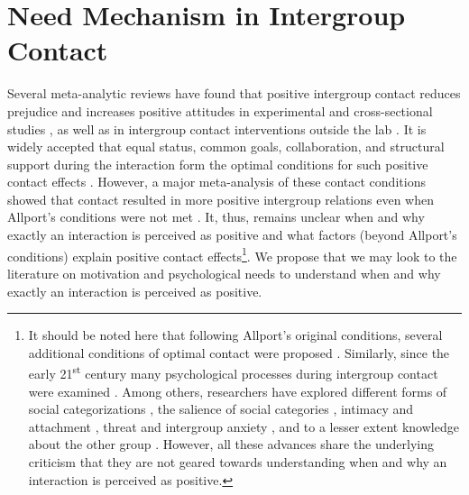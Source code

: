 \documentclass[man, 12pt, a4paper, mask]{apa7}
\theoremstyle{break}
\theoremstyle{plain}
\begin{document}
\section{Need Mechanism in Intergroup Contact}
Several meta-analytic reviews have found that positive intergroup contact reduces prejudice and increases positive attitudes in experimental and cross-sectional studies \citep[][]{Tropp2005, Pettigrew2006, Davies2011}, as well as in intergroup contact interventions outside the lab \citep[][]{Beelmann2014, Lemmer2015}. It is widely accepted that equal status, common goals, collaboration, and structural support during the interaction form the optimal conditions for such positive contact effects \citep[Allport's Optimal Contact conditions;][]{Allport1954b, Pettigrew1969}. However, a major meta-analysis of these contact conditions showed that contact resulted in more positive intergroup relations even when Allport's conditions were not met \citep[][]{Pettigrew2006}. It, thus, remains unclear when and why exactly an interaction is perceived as positive and what factors (beyond Allport's conditions) explain positive contact effects\footnote{It should be noted here that following Allport's original conditions, several additional conditions of optimal contact were proposed \citep[for a critical discussion see][]{Pettigrew1986}. Similarly, since the early 21\textsuperscript{st} century many psychological processes during intergroup contact were examined \citep[e.g. see,][]{Paolini2021}. Among others, researchers have explored different forms of social categorizations \citep[][]{Pettigrew1998}, the salience of social categories \citep[][]{Brown2005}, intimacy \citep[e.g.,][]{Marinucci2021} and attachment \citep[e.g.,][]{Tropp2021}, threat and intergroup anxiety \citep[e.g.,][]{Stephan2008, Paolini2004}, and to a lesser extent knowledge about the other group \citep[][]{Pettigrew2008c}. However, all these advances share the underlying criticism that they are not geared towards understanding when and why an interaction is perceived as positive.}. We propose that we may look to the literature on motivation and psychological needs to understand when and why exactly an interaction is perceived as positive.
\end{document}
